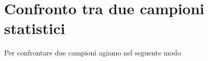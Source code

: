 \section{Confronto tra due campioni statistici}
Per confrontare due campioni agiamo nel seguente modo